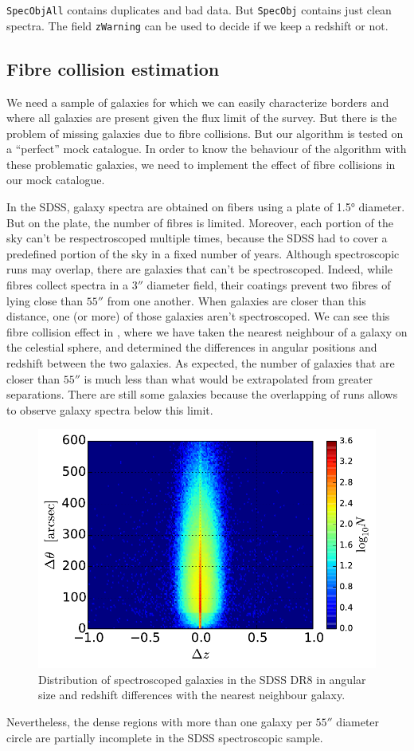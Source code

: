 \texttt{SpecObjAll} contains duplicates and bad data. But \texttt{SpecObj}
contains just clean spectra. The field \texttt{zWarning} can be used to decide
if we keep a redshift or not.

\subsection{Fibre collision estimation}

We need a sample of galaxies for which we can easily characterize borders and
where all galaxies are present given the flux limit of the survey. But there is
the problem of missing galaxies due to fibre collisions. But our algorithm is
tested on a ``perfect'' mock catalogue. In order to know the behaviour of the
algorithm with these problematic galaxies, we need to implement the effect of
fibre collisions in our mock catalogue.

In the SDSS, galaxy spectra are obtained on fibers using a plate of 1.5°
diameter. But on the plate, the number of fibres is limited. Moreover, each
portion of the sky can't be respectroscoped multiple times, because the SDSS
had to cover a predefined portion of the sky in a fixed number of years.
Although spectroscopic runs may overlap, there are galaxies that can't be
spectroscoped. Indeed, while fibres collect spectra in a $3''$ diameter field,
their coatings prevent two fibres of lying close than $55''$ from one another.
When galaxies are closer than this distance, one (or more) of those galaxies
aren't spectroscoped. We can see this fibre collision effect in
, where we have taken the nearest neighbour of a galaxy on
the celestial sphere, and determined the differences in angular positions and
redshift between the two galaxies. As expected, the number of galaxies that are
closer than $55''$ is much less than what would be extrapolated from greater
separations. There are still some galaxies because the overlapping of runs
allows to observe galaxy spectra below this limit.

\begin{figure}[ht] \centering
    \includegraphics[width=0.6\linewidth]{figures/sdss/plane.pdf}
    \caption{\footnotesize{}Distribution of spectroscoped galaxies in the SDSS
    DR8 in angular size and redshift differences with the nearest neighbour
galaxy.\label{fig:plane}} \end{figure}
%
Nevertheless, the dense regions with more than one galaxy per $55''$ diameter
circle are partially incomplete in the SDSS spectroscopic sample.

